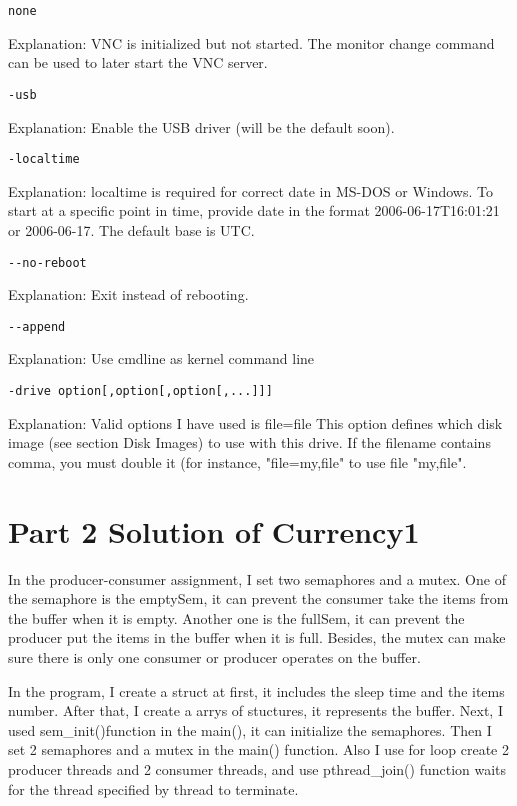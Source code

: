 \documentclass[10pt,draftclsnofoot,peerreview,letterpaper,onecolumn,]{IEEEtran}
\begin{document}
\begin{verbatim}none\end{verbatim} 
Explanation: VNC is initialized but not started. The monitor change command can be used to later start the VNC server.

\begin{verbatim}
-usb 
\end{verbatim}
Explanation: Enable the USB driver (will be the default soon).

\begin{verbatim}
-localtime
\end{verbatim}
Explanation: localtime is required for correct date in MS-DOS or Windows. To start at a specific point in time, provide date in the format 2006-06-17T16:01:21 or 2006-06-17. The default base is UTC.

\begin{verbatim}
--no-reboot
\end{verbatim}
Explanation: Exit instead of rebooting.

\begin{verbatim}
--append
\end{verbatim}
Explanation: Use cmdline as kernel command line

\begin{verbatim}
-drive option[,option[,option[,...]]]
\end{verbatim} 
Explanation: Valid options I have used is \:
file=file
This option defines which disk image (see section Disk Images) to use with this drive. If the filename contains comma, you must double it (for instance, "file=my,file" to use file "my,file".


\newpage
\section{Part 2 Solution of Currency1}

In the producer-consumer assignment, I set two semaphores and a mutex. One of the semaphore is the emptySem, it can prevent the consumer take the items from the buffer when it is empty. Another one is the fullSem, it can prevent the producer put the items in the buffer when it is full. Besides, the mutex can make sure there is only one consumer or producer operates on the buffer.

In the program, I create a struct at first, it includes the sleep time and the items number. After that, I create a arrys of stuctures, it represents the buffer. Next, I used sem\_init()function in the main(), it can initialize the semaphores. Then I set 2 semaphores and a mutex in the main() function. Also I use for loop create 2 producer threads and 2 consumer threads, and use pthread\_join() function waits for the thread specified by thread to terminate.
\end{document}
